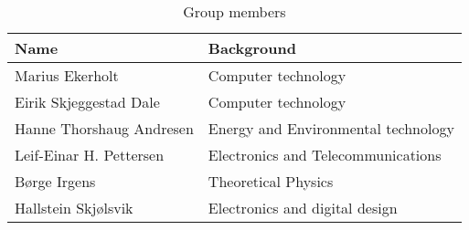 \begin{table}
	\begin{center}
		\begin{tabular}{|l|l|}   
			\hline      
			\bf{Name} & \bf{Background} \\ 
			\hline
			Marius Ekerholt & Computer technology\\     
			\hline
			Eirik Skjeggestad Dale & Computer technology\\     
			\hline
			Hanne Thorshaug Andresen & Energy and Environmental technology\\     
			\hline
			Leif-Einar H. Pettersen & Electronics and Telecommunications\\     
			\hline
			Børge Irgens & Theoretical Physics\\     
			\hline
			Hallstein Skjølsvik & Electronics and digital design\\     
			\hline
		 \end{tabular}
	\end{center}
	\caption{Group members}
	\label{tab:groupmembers}
\end{table}
